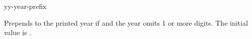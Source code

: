 \documentclass{beerydoc}
\begin{document}
\begin{codedoc}{yy-year-prefix}
  \begin{syntax}
  \end{syntax}
  Prepends  to the printed year if  and the year
  omits 1 or more digits.
  The initial value is .
  \begin{codedemo}
    \\
    \\
    \\
  \end{codedemo}
\end{codedoc}
\end{document}
